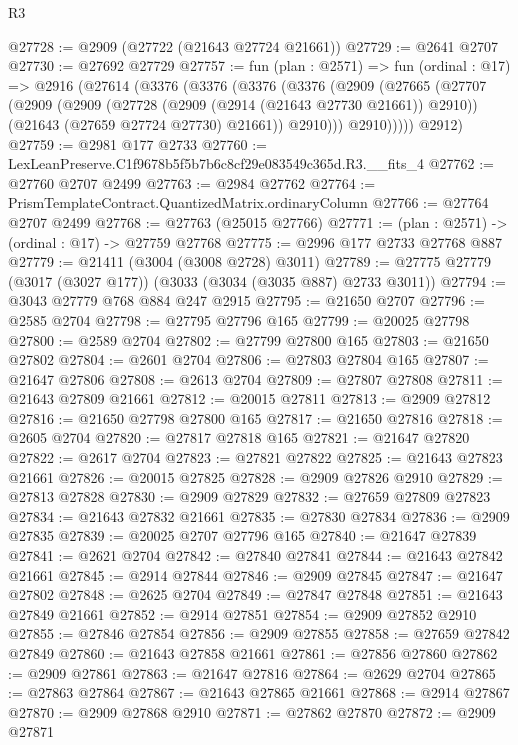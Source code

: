\begin{lexlean}{R3}
\begin{coremodule}
@27728 := @2909 (@27722 (@21643 @27724 @21661))
@27729 := @2641 @2707
@27730 := @27692 @27729
@27757 := fun (plan : @2571) =>
  fun (ordinal : @17) =>
  @2916
    (@27614
      (@3376
        (@3376
          (@3376
            (@3376
              (@2909
                (@27665
                  (@27707
                    (@2909
                      (@2909
                        (@27728 (@2909 (@2914 (@21643 @27730 @21661)) @2910))
                        (@21643 (@27659 @27724 @27730) @21661))
                      @2910)))
                @2910)))))
      @2912)
@27759 := @2981 @177 @2733
@27760 := LexLeanPreserve.C1f9678b5f5b7b6c8cf29e083549c365d.R3.__fits_4
@27762 := @27760 @2707 @2499
@27763 := @2984 @27762
@27764 := PrismTemplateContract.QuantizedMatrix.ordinaryColumn
@27766 := @27764 @2707 @2499
@27768 := @27763 (@25015 @27766)
@27771 := (plan : @2571) -> (ordinal : @17) -> @27759 @27768
@27775 := @2996 @177 @2733 @27768 @887
@27779 := @21411 (@3004 (@3008 @2728) @3011)
@27789 := @27775 @27779 (@3017 (@3027 @177)) (@3033 (@3034 (@3035 @887) @2733 @3011))
@27794 := @3043 @27779 @768 @884 @247 @2915
@27795 := @21650 @2707
@27796 := @2585 @2704
@27798 := @27795 @27796 @165
@27799 := @20025 @27798
@27800 := @2589 @2704
@27802 := @27799 @27800 @165
@27803 := @21650 @27802
@27804 := @2601 @2704
@27806 := @27803 @27804 @165
@27807 := @21647 @27806
@27808 := @2613 @2704
@27809 := @27807 @27808
@27811 := @21643 @27809 @21661
@27812 := @20015 @27811
@27813 := @2909 @27812
@27816 := @21650 @27798 @27800 @165
@27817 := @21650 @27816
@27818 := @2605 @2704
@27820 := @27817 @27818 @165
@27821 := @21647 @27820
@27822 := @2617 @2704
@27823 := @27821 @27822
@27825 := @21643 @27823 @21661
@27826 := @20015 @27825
@27828 := @2909 @27826 @2910
@27829 := @27813 @27828
@27830 := @2909 @27829
@27832 := @27659 @27809 @27823
@27834 := @21643 @27832 @21661
@27835 := @27830 @27834
@27836 := @2909 @27835
@27839 := @20025 @2707 @27796 @165
@27840 := @21647 @27839
@27841 := @2621 @2704
@27842 := @27840 @27841
@27844 := @21643 @27842 @21661
@27845 := @2914 @27844
@27846 := @2909 @27845
@27847 := @21647 @27802
@27848 := @2625 @2704
@27849 := @27847 @27848
@27851 := @21643 @27849 @21661
@27852 := @2914 @27851
@27854 := @2909 @27852 @2910
@27855 := @27846 @27854
@27856 := @2909 @27855
@27858 := @27659 @27842 @27849
@27860 := @21643 @27858 @21661
@27861 := @27856 @27860
@27862 := @2909 @27861
@27863 := @21647 @27816
@27864 := @2629 @2704
@27865 := @27863 @27864
@27867 := @21643 @27865 @21661
@27868 := @2914 @27867
@27870 := @2909 @27868 @2910
@27871 := @27862 @27870
@27872 := @2909 @27871

\end{coremodule}
\end{lexlean}
